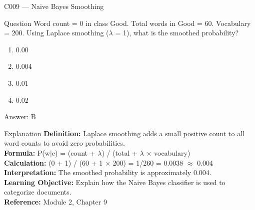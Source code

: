 \documentclass[aspectratio=169,8pt]{beamer}
\begin{document}
	\begin{frame}{C009 --- Naive Bayes Smoothing}
		\begin{block}{Question}
			Word count = 0 in class Good. Total words in Good = 60. Vocabulary = 200. Using Laplace smoothing ($\lambda$ = 1), what is the smoothed probability?
			\begin{enumerate}
				\item 0.00
				\item 0.004
				\item 0.01
				\item 0.02
			\end{enumerate}
		\end{block}
		\begin{exampleblock}{Answer: B}\end{exampleblock}
		\begin{block}{Explanation}
			\textbf{Definition:} Laplace smoothing adds a small positive count to all word counts to avoid zero probabilities.\\
			\textbf{Formula:} P(w$|$c) = (count + $\lambda$) / (total + $\lambda$ $\times$ vocabulary)\\
			\textbf{Calculation:} (0 + 1) / (60 + 1 $\times$ 200) = 1/260 = 0.0038 $\approx$ 0.004\\
			\textbf{Interpretation:} The smoothed probability is approximately 0.004.\\
			\textbf{Learning Objective:} Explain how the Naive Bayes classifier is used to categorize documents.\\
			\textbf{Reference:} Module 2, Chapter 9
		\end{block}
	\end{frame}
	
\end{document}
